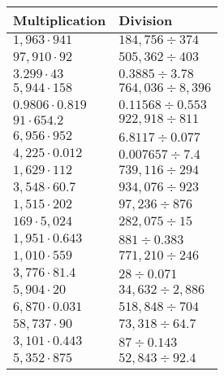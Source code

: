 \begin{longtable}[]{@{}ll@{}}
\toprule
Multiplication & Division\tabularnewline
\midrule
\endhead
\(1,963\cdot941\) & \(184,756÷374\)\tabularnewline
\(97,910\cdot92\) & \(505,362÷403\)\tabularnewline
\(3.299\cdot43\) & \(0.3885÷3.78\)\tabularnewline
\(5,944\cdot158\) & \(764,036÷8,396\)\tabularnewline
\(0.9806\cdot0.819\) & \(0.11568÷0.553\)\tabularnewline
\(91\cdot654.2\) & \(922,918÷811\)\tabularnewline
\(6,956\cdot952\) & \(6.8117÷0.077\)\tabularnewline
\(4,225\cdot0.012\) & \(0.007657÷7.4\)\tabularnewline
\(1,629\cdot112\) & \(739,116÷294\)\tabularnewline
\(3,548\cdot60.7\) & \(934,076÷923\)\tabularnewline
\(1,515\cdot202\) & \(97,236÷876\)\tabularnewline
\(169\cdot5,024\) & \(282,075÷15\)\tabularnewline
\(1,951\cdot0.643\) & \(881÷0.383\)\tabularnewline
\(1,010\cdot559\) & \(771,210÷246\)\tabularnewline
\(3,776\cdot81.4\) & \(28÷0.071\)\tabularnewline
\(5,904\cdot20\) & \(34,632÷2,886\)\tabularnewline
\(6,870\cdot0.031\) & \(518,848÷704\)\tabularnewline
\(58,737\cdot90\) & \(73,318÷64.7\)\tabularnewline
\(3,101\cdot0.443\) & \(87÷0.143\)\tabularnewline
\(5,352\cdot875\) & \(52,843÷92.4\)\tabularnewline
\bottomrule
\end{longtable}
